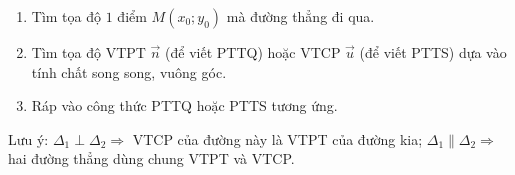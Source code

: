 \begin{enumerate}
\item Tìm tọa độ $1$ điểm $M(x_0; y_0)$ mà đường thẳng đi qua.
\item Tìm tọa độ VTPT $\overrightarrow{n}$ (để viết PTTQ) hoặc VTCP $\overrightarrow{u}$ (để viết PTTS) dựa vào tính chất song song, vuông góc.
\item Ráp vào công thức PTTQ hoặc PTTS tương ứng.
\end{enumerate}
Lưu ý: $\Delta_1 \perp \Delta_2 \Rightarrow$ VTCP của đường này là VTPT của đường kia; $\Delta_1 \parallel \Delta_2 \Rightarrow$ hai đường thẳng dùng chung VTPT và VTCP.

